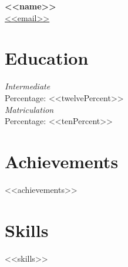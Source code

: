 \documentclass[a4paper,10pt]{article}
\begin{document}
\begin{center}
    {\Huge \bfseries <<name>>} \\
    \vspace{0.2em}
    \href{mailto:your.email@example.com}{<<email>>}  \\
\end{center}

\section*{Education}

\textit{Intermediate} \\
Percentage: <<twelvePercent>> \\
\textit{Matriculation} \\
Percentage: <<tenPercent>> \\


\section*{Achievements}

\begin{myitemize}
    <<achievements>>
\end{myitemize}


\section*{Skills}
\begin{myitemize}
    <<skills>>
\end{myitemize}

\end{document}
